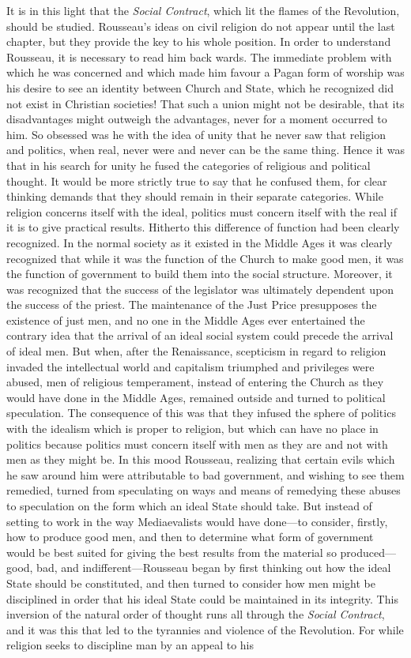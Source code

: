 \documentclass{book}
\begin{document}
It is in this light that the \emph{Social Contract}, which lit the flames of the Revolution, should be studied. Rousseau’s ideas on civil religion do not appear until the last chapter, but they provide the key to his whole position. In order to understand Rousseau, it is necessary to read him back wards. The immediate problem with which he was concerned and which made him favour a Pagan form of worship was his desire to see an identity between Church and State, which he recognized did not exist in Christian societies! That such a union might not be desirable, that its disadvantages might outweigh the advantages, never for a moment occurred to him. So obsessed was he with the idea of unity that he never saw that religion and politics, when real, never were and never can be the same thing. Hence it was that in his search for unity he fused the categories of religious and political thought. It would be more strictly true to say that he confused them, for clear thinking demands that they should remain in their separate categories. While religion concerns itself with the ideal, politics must concern itself with the real if it is to give practical results. Hitherto this difference of function had been clearly recognized. In the normal society as it existed in the Middle Ages it was clearly recognized that while it was the function of the Church to make good men, it was the function of government to build them into the social structure. Moreover, it was recognized that the success of the legislator was ultimately dependent upon the success of the priest. The maintenance of the Just Price presupposes the existence of just men, and no one in the Middle Ages ever entertained the contrary idea that the arrival of an ideal social system could precede the arrival of ideal men. But when, after the Renaissance, scepticism in regard to religion invaded the intellectual world and capitalism triumphed and privileges were abused, men of religious temperament, instead of entering the Church as they would have done in the Middle Ages, remained outside and turned to political speculation. The consequence of this was that they infused the sphere of politics with the idealism which is proper to religion, but which can have no place in politics because politics must concern itself with men as they are and not with men as they might be. In this mood Rousseau, realizing that certain evils which he saw around him were attributable to bad government, and wishing to see them remedied, turned from speculating on ways and means of remedying these abuses to speculation on the form which an ideal State should take. But instead of setting to work in the way Mediaevalists would have done—to consider, firstly, how to produce good men, and then to determine what form of government would be best suited for giving the best results from the material so produced—good, bad, and indifferent—Rousseau began by first thinking out how the ideal State should be constituted, and then turned to consider how men might be disciplined in order that his ideal State could be maintained in its integrity. This inversion of the natural order of thought runs all through the \emph{Social Contract}, and it was this that led to the tyrannies and violence of the Revolution. For while religion seeks to discipline man by an appeal to his 
\end{document}
